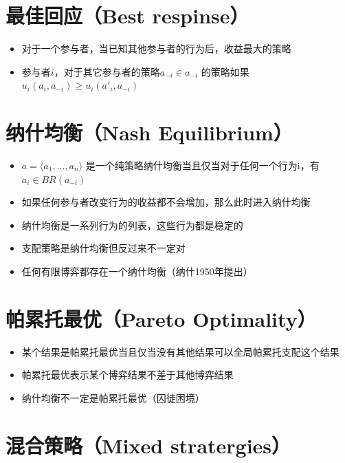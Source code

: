 \documentclass[]{book}
\providecommand{\tightlist}{%
  \setlength{\itemsep}{0pt}\setlength{\parskip}{0pt}}
\begin{document}
\hypertarget{best-respinse}{%
\section{最佳回应（Best respinse）}\label{best-respinse}}

\begin{itemize}
\tightlist
\item
  对于一个参与者，当已知其他参与者的行为后，收益最大的策略
\item
  参与者\(i\)，对于其它参与者的策略\(a_{-i} \in a_{-i}\) 的策略如果\(u_i(a_i,a_{-i}) \geqslant u_i(a'_i,a_{-i})\)
\end{itemize}

\hypertarget{nash-equilibrium}{%
\section{纳什均衡（Nash Equilibrium）}\label{nash-equilibrium}}

\begin{itemize}
\tightlist
\item
  \(a = \langle a_1,...,a_n\rangle\) 是一个纯策略纳什均衡当且仅当对于任何一个行为i，有\(a_i \in BR(a_{-i})\)
\item
  如果任何参与者改变行为的收益都不会增加，那么此时进入纳什均衡
\item
  纳什均衡是一系列行为的列表，这些行为都是稳定的
\item
  支配策略是纳什均衡但反过来不一定对
\item
  任何有限博弈都存在一个纳什均衡（纳什1950年提出）
\end{itemize}

\hypertarget{pareto-optimality}{%
\section{帕累托最优（Pareto Optimality）}\label{pareto-optimality}}

\begin{itemize}
\tightlist
\item
  某个结果是帕累托最优当且仅当没有其他结果可以全局帕累托支配这个结果
\item
  帕累托最优表示某个博弈结果不差于其他博弈结果
\item
  纳什均衡不一定是帕累托最优（囚徒困境）
\end{itemize}

\hypertarget{mixed-stratergies}{%
\section{混合策略（Mixed stratergies）}\label{mixed-stratergies}}
\end{document}

